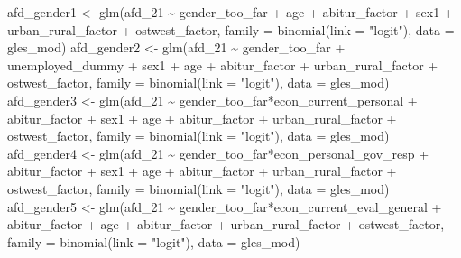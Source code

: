 \documentclass[
]{article}
\newenvironment{Shaded}{\begin{snugshade}}{\end{snugshade}}
\newcommand{\AttributeTok}[1]{\textcolor[rgb]{0.77,0.63,0.00}{#1}}
\newcommand{\FunctionTok}[1]{\textcolor[rgb]{0.00,0.00,0.00}{#1}}
\newcommand{\NormalTok}[1]{#1}
\newcommand{\OtherTok}[1]{\textcolor[rgb]{0.56,0.35,0.01}{#1}}
\newcommand{\SpecialCharTok}[1]{\textcolor[rgb]{0.00,0.00,0.00}{#1}}
\newcommand{\StringTok}[1]{\textcolor[rgb]{0.31,0.60,0.02}{#1}}
\begin{document}
\begin{Shaded}
\begin{Highlighting}[]
\NormalTok{afd\_gender1 }\OtherTok{\textless{}{-}} \FunctionTok{glm}\NormalTok{(afd\_21 }\SpecialCharTok{\textasciitilde{}}\NormalTok{ gender\_too\_far }\SpecialCharTok{+}\NormalTok{ age }\SpecialCharTok{+}\NormalTok{ abitur\_factor }\SpecialCharTok{+}\NormalTok{ sex1 }\SpecialCharTok{+}\NormalTok{ urban\_rural\_factor }\SpecialCharTok{+}\NormalTok{ ostwest\_factor, }
                  \AttributeTok{family =} \FunctionTok{binomial}\NormalTok{(}\AttributeTok{link =} \StringTok{"logit"}\NormalTok{), }
                  \AttributeTok{data =}\NormalTok{ gles\_mod)}
\NormalTok{afd\_gender2 }\OtherTok{\textless{}{-}} \FunctionTok{glm}\NormalTok{(afd\_21 }\SpecialCharTok{\textasciitilde{}}\NormalTok{ gender\_too\_far }\SpecialCharTok{+}\NormalTok{ unemployed\_dummy }\SpecialCharTok{+}\NormalTok{ sex1 }\SpecialCharTok{+}\NormalTok{ age }\SpecialCharTok{+}\NormalTok{ abitur\_factor }\SpecialCharTok{+}\NormalTok{  urban\_rural\_factor }\SpecialCharTok{+}\NormalTok{ ostwest\_factor, }
                  \AttributeTok{family =} \FunctionTok{binomial}\NormalTok{(}\AttributeTok{link =} \StringTok{"logit"}\NormalTok{), }
                  \AttributeTok{data =}\NormalTok{ gles\_mod)}
\NormalTok{afd\_gender3 }\OtherTok{\textless{}{-}} \FunctionTok{glm}\NormalTok{(afd\_21 }\SpecialCharTok{\textasciitilde{}}\NormalTok{ gender\_too\_far}\SpecialCharTok{*}\NormalTok{econ\_current\_personal }\SpecialCharTok{+}\NormalTok{ abitur\_factor }\SpecialCharTok{+}\NormalTok{ sex1 }\SpecialCharTok{+}\NormalTok{ age }\SpecialCharTok{+}\NormalTok{ abitur\_factor }\SpecialCharTok{+}\NormalTok{  urban\_rural\_factor }\SpecialCharTok{+}\NormalTok{ ostwest\_factor, }
                  \AttributeTok{family =} \FunctionTok{binomial}\NormalTok{(}\AttributeTok{link =} \StringTok{"logit"}\NormalTok{), }
                  \AttributeTok{data =}\NormalTok{ gles\_mod)}
\NormalTok{afd\_gender4 }\OtherTok{\textless{}{-}} \FunctionTok{glm}\NormalTok{(afd\_21 }\SpecialCharTok{\textasciitilde{}}\NormalTok{ gender\_too\_far}\SpecialCharTok{*}\NormalTok{econ\_personal\_gov\_resp }\SpecialCharTok{+}\NormalTok{ abitur\_factor }\SpecialCharTok{+}\NormalTok{ sex1 }\SpecialCharTok{+}\NormalTok{ age }\SpecialCharTok{+}\NormalTok{ abitur\_factor }\SpecialCharTok{+}\NormalTok{  urban\_rural\_factor }\SpecialCharTok{+}\NormalTok{ ostwest\_factor, }
                  \AttributeTok{family =} \FunctionTok{binomial}\NormalTok{(}\AttributeTok{link =} \StringTok{"logit"}\NormalTok{), }
                  \AttributeTok{data =}\NormalTok{ gles\_mod)}
\NormalTok{afd\_gender5 }\OtherTok{\textless{}{-}} \FunctionTok{glm}\NormalTok{(afd\_21 }\SpecialCharTok{\textasciitilde{}}\NormalTok{ gender\_too\_far}\SpecialCharTok{*}\NormalTok{econ\_current\_eval\_general }\SpecialCharTok{+}\NormalTok{ abitur\_factor }\SpecialCharTok{+}\NormalTok{ age }\SpecialCharTok{+}\NormalTok{ abitur\_factor }\SpecialCharTok{+}\NormalTok{  urban\_rural\_factor }\SpecialCharTok{+}\NormalTok{ ostwest\_factor, }
                  \AttributeTok{family =} \FunctionTok{binomial}\NormalTok{(}\AttributeTok{link =} \StringTok{"logit"}\NormalTok{), }
                  \AttributeTok{data =}\NormalTok{ gles\_mod)}


\end{Highlighting}
\end{Shaded}
\end{document}
